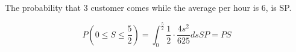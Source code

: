 \documentclass[12pt]{article}
\begin{document}
    The probability that 3 customer comes while the average per hour is 6, is SP.
    
    \[
        P(0 \leq S \leq \frac{5}{2}) = \int_{0}^{\frac{5}{2}} \frac{1}{2} \cdot \frac{{4s^2}}{625} ds
        
        SP = PS
    \]
\end{document}
